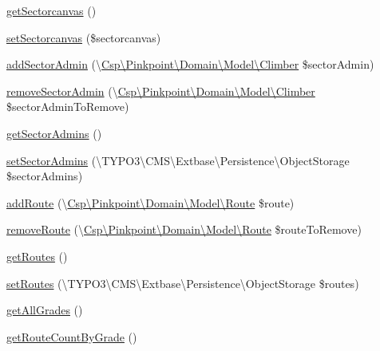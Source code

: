 \begin{DoxyCompactItemize}
\hyperlink{classCsp_1_1Pinkpoint_1_1Domain_1_1Model_1_1Sector_aba8c9e510759a17b295588b0589cbfa5}{get\+Sectorcanvas} ()
\item 
\hyperlink{classCsp_1_1Pinkpoint_1_1Domain_1_1Model_1_1Sector_a2f6101039253b9efc99cd68783c3f179}{set\+Sectorcanvas} (\$sectorcanvas)
\item 
\hyperlink{classCsp_1_1Pinkpoint_1_1Domain_1_1Model_1_1Sector_af9b321fd2d6e915208d48d82b3e1d0c0}{add\+Sector\+Admin} (\textbackslash{}\hyperlink{classCsp_1_1Pinkpoint_1_1Domain_1_1Model_1_1Climber}{Csp\textbackslash{}\+Pinkpoint\textbackslash{}\+Domain\textbackslash{}\+Model\textbackslash{}\+Climber} \$sector\+Admin)
\item 
\hyperlink{classCsp_1_1Pinkpoint_1_1Domain_1_1Model_1_1Sector_ad65ca58d005f3cd5806022d8d4fd928f}{remove\+Sector\+Admin} (\textbackslash{}\hyperlink{classCsp_1_1Pinkpoint_1_1Domain_1_1Model_1_1Climber}{Csp\textbackslash{}\+Pinkpoint\textbackslash{}\+Domain\textbackslash{}\+Model\textbackslash{}\+Climber} \$sector\+Admin\+To\+Remove)
\item 
\hyperlink{classCsp_1_1Pinkpoint_1_1Domain_1_1Model_1_1Sector_a6b6f1a6e985bf81c90e76d87e0427078}{get\+Sector\+Admins} ()
\item 
\hyperlink{classCsp_1_1Pinkpoint_1_1Domain_1_1Model_1_1Sector_a85978e7c7a602df1380046d7c14cd722}{set\+Sector\+Admins} (\textbackslash{}T\+Y\+P\+O3\textbackslash{}\+C\+M\+S\textbackslash{}\+Extbase\textbackslash{}\+Persistence\textbackslash{}\+Object\+Storage \$sector\+Admins)
\item 
\hyperlink{classCsp_1_1Pinkpoint_1_1Domain_1_1Model_1_1Sector_a767436d78e515d327341c9bb189c9f2e}{add\+Route} (\textbackslash{}\hyperlink{classCsp_1_1Pinkpoint_1_1Domain_1_1Model_1_1Route}{Csp\textbackslash{}\+Pinkpoint\textbackslash{}\+Domain\textbackslash{}\+Model\textbackslash{}\+Route} \$route)
\item 
\hyperlink{classCsp_1_1Pinkpoint_1_1Domain_1_1Model_1_1Sector_abda5c3d25e77ab7c8baa0a653f546db4}{remove\+Route} (\textbackslash{}\hyperlink{classCsp_1_1Pinkpoint_1_1Domain_1_1Model_1_1Route}{Csp\textbackslash{}\+Pinkpoint\textbackslash{}\+Domain\textbackslash{}\+Model\textbackslash{}\+Route} \$route\+To\+Remove)
\item 
\hyperlink{classCsp_1_1Pinkpoint_1_1Domain_1_1Model_1_1Sector_a9137a6e0750590fd4985cc70c08b9a9b}{get\+Routes} ()
\item 
\hyperlink{classCsp_1_1Pinkpoint_1_1Domain_1_1Model_1_1Sector_aff75e0c9042a63b212498dcaef1b6789}{set\+Routes} (\textbackslash{}T\+Y\+P\+O3\textbackslash{}\+C\+M\+S\textbackslash{}\+Extbase\textbackslash{}\+Persistence\textbackslash{}\+Object\+Storage \$routes)
\item 
\hyperlink{classCsp_1_1Pinkpoint_1_1Domain_1_1Model_1_1Sector_a07d5fcb24d41daea8092b5591cd63c62}{get\+All\+Grades} ()
\item 
\hyperlink{classCsp_1_1Pinkpoint_1_1Domain_1_1Model_1_1Sector_ac39d5b9a488078aa661547663aac2bc1}{get\+Route\+Count\+By\+Grade} ()
\end{DoxyCompactItemize}
